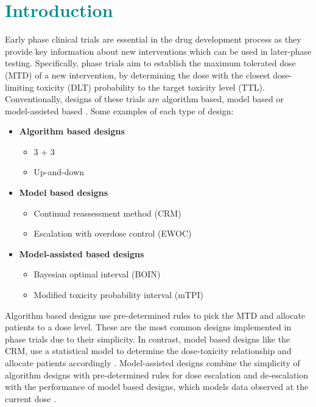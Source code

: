\documentclass[a4paper, 11pt]{article} %
\newcommand{\RN}[1]{
	\textup{\uppercase\expandafter{\romannumeral#1}}} %
\begin{document}
\section{\textcolor{DarkCyan}{Introduction}}

Early phase clinical trials are essential in the drug development process as they provide key information about new interventions which can be used in later-phase testing. Specifically, phase\RN{1} trials aim to establish the maximum tolerated dose (MTD) of a new intervention, by determining the dose with the closest dose-limiting toxicity (DLT) probability to the target toxicity level (TTL). Conventionally, designs of these trials are algorithm based, model based or model-assisted based \cite{Zhou2018}. Some examples of each type of design: 

\begin{itemize}
	\item \textbf{Algorithm based designs}
		\begin{itemize}
			\item 3 + 3
			\item Up-and-down
		\end{itemize}
	\item \textbf{Model based designs}
		\begin{itemize}
			\item Continual reassessment method (CRM)
			\item Escalation with overdose control (EWOC)
		\end{itemize}
	\item \textbf{Model-assisted based designs}
		\begin{itemize}
			\item Bayesian optimal interval (BOIN)
			\item Modified toxicity probability interval (mTPI)
		\end{itemize}
\end{itemize}

\noindent Algorithm based designs use pre-determined rules to pick the MTD and allocate patients to a dose level. These are the most common designs implemented in phase\RN{1} trials due to their simplicity. In contrast, model based designs like the CRM, use a statistical model to determine the dose-toxicity relationship and allocate patients accordingly \cite{Love2017}. Model-assisted designs combine the simplicity of algorithm designs with pre-determined rules for dose escalation and de-escalation with the performance of model based designs, which models data observed at the current dose \cite{Zhou2018}.\\ 
\end{document}
